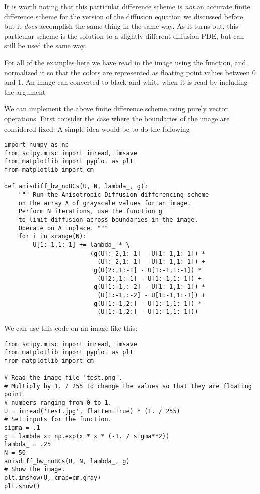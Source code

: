 It is worth noting that this particular difference scheme is \textit{not} an accurate finite difference scheme for the version of the diffusion equation we discussed before, but it \textit{does} accomplish the same thing in the same way.
As it turns out, this particular scheme is the solution to a slightly different diffusion PDE, but can still be used the same way.

For all of the examples here we have read in the image using the  function, and normalized it so that the colors are represented as floating point values between 0 and 1.
An image can converted to black and white when it is read by including the argument 

We can implement the above finite difference scheme using purely vector operations.
First consider the case where the boundaries of the image are considered fixed.
A simple idea would be to do the following
\begin{lstlisting}
import numpy as np
from scipy.misc import imread, imsave
from matplotlib import pyplot as plt
from matplotlib import cm

def anisdiff_bw_noBCs(U, N, lambda_, g):
    """ Run the Anisotropic Diffusion differencing scheme
    on the array A of grayscale values for an image.
    Perform N iterations, use the function g
    to limit diffusion across boundaries in the image.
    Operate on A inplace. """
    for i in xrange(N):
        U[1:-1,1:-1] += lambda_ * \
                        (g(U[:-2,1:-1] - U[1:-1,1:-1]) *
                          (U[:-2,1:-1] - U[1:-1,1:-1]) +
                         g(U[2:,1:-1] - U[1:-1,1:-1]) *
                          (U[2:,1:-1] - U[1:-1,1:-1]) +
                         g(U[1:-1,:-2] - U[1:-1,1:-1]) *
                          (U[1:-1,:-2] - U[1:-1,1:-1]) +
                         g(U[1:-1,2:] - U[1:-1,1:-1]) *
                          (U[1:-1,2:] - U[1:-1,1:-1]))
\end{lstlisting}
We can use this code on an image like this:
\begin{lstlisting}
from scipy.misc import imread, imsave
from matplotlib import pyplot as plt
from matplotlib import cm

# Read the image file 'test.png'.
# Multiply by 1. / 255 to change the values so that they are floating point
# numbers ranging from 0 to 1.
U = imread('test.jpg', flatten=True) * (1. / 255)
# Set inputs for the function.
sigma = .1
g = lambda x: np.exp(x * x * (-1. / sigma**2))
lambda_ = .25
N = 50
anisdiff_bw_noBCs(U, N, lambda_, g)
# Show the image.
plt.imshow(U, cmap=cm.gray)
plt.show()
\end{lstlisting}

